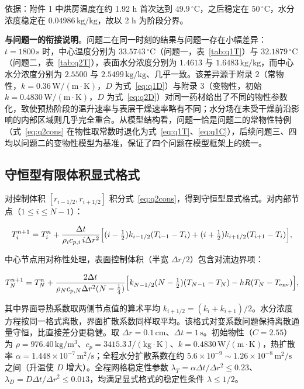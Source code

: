 \documentclass[withoutpreface,bwprint]{cumcmthesis} %
\begin{document}
依据：附件 1 中烘房温度在约 1.92 h 首次达到 $49.9\,{}^\circ$C，之后稳定在 $50\,{}^\circ$C，水分浓度稳定在 $0.04986\,\mathrm{kg/kg}$，故以 2 h 为阶段分界。

\textbf{与问题一的衔接说明}。问题二在同一时刻的结果与问题一存在小幅差异：$t=1800\,\mathrm{s}$ 时，中心温度分别为 $33.5743\,{}^\circ$C（问题一，表~\ref{tab:q1T}）与 $32.1879\,{}^\circ$C（问题二，表~\ref{tab:q2T}），表面水分浓度分别为 $1.4613$ 与 $1.6483\,\mathrm{kg/kg}$，而中心水分浓度分别为 $2.5500$ 与 $2.5499\,\mathrm{kg/kg}$、几乎一致。该差异源于附录 2（常物性，$k=0.36\,\mathrm{W/(m\cdot K)}$，$D$ 为式~\eqref{eq:q1D}）与附录 3（变物性，初始 $k=0.4830\,\mathrm{W/(m\cdot K)}$，$D$ 为式~\eqref{eq:q2D}）对同一药材给出了不同的物性参数化，致使预热阶段的温升速率与表层干燥速率略有不同；水分场在未受干燥前沿影响的内部区域则几乎完全重合。从模型结构看，问题一恰是问题二的常物性特例（式~\eqref{eq:q2cons} 在物性取常数时退化为式~\eqref{eq:q1T}、\eqref{eq:q1C}），后续问题三、四均以问题二的变物性模型为基准，保证了四个问题在模型框架上的统一。

\subsection{守恒型有限体积显式格式}

对控制体积 $[r_{i-1/2},r_{i+1/2}]$ 积分式~\eqref{eq:q2cons}，得到守恒型显式格式。对内部节点（$1\le i\le N-1$）：

\begin{equation}
T_i^{n+1}=T_i^n+\frac{\Delta t}{\rho_i c_{p,i}\,i\Delta r^2}
\Bigl[(i-\tfrac12)k_{i-1/2}(T_{i-1}-T_i)
+(i+\tfrac12)k_{i+1/2}(T_{i+1}-T_i)\Bigr],
\end{equation}

中心节点用对称性处理，表面控制体积（半宽 $\Delta r/2$）包含对流边界项：

\begin{equation}
T_N^{n+1}=T_N^n+\frac{2\Delta t}{\rho_N c_{p,N}\Delta r^2(N-\tfrac14)}
\Bigl[k_{N-1/2}(N-\tfrac12)(T_{N-1}-T_N)-hR(T_N-T_{\mathrm{env}})\Bigr],
\end{equation}

其中界面导热系数取两侧节点值的算术平均 $k_{i+1/2}=(k_i+k_{i+1})/2$。水分浓度方程按同一格式离散，界面扩散系数同样取平均。该格式对变系数问题保持离散通量守恒，比直接差分更稳健。取 $\Delta r=0.1\,\mathrm{cm}$、$\Delta t=1\,\mathrm{s}$。初始物性（$C=2.55$）为 $\rho=976.40\,\mathrm{kg/m^3}$、$c_p=3415.3\,\mathrm{J/(kg\cdot K)}$、$k=0.4830\,\mathrm{W/(m\cdot K)}$，热扩散率 $\alpha=1.448\times10^{-7}\,\mathrm{m^2/s}$；全程水分扩散系数在约 $5.6\times10^{-9}\sim1.26\times10^{-8}\,\mathrm{m^2/s}$ 之间（升温使 $D$ 增大）。全程网格稳定性参数 $\lambda_T=\alpha\Delta t/\Delta r^2\le0.23$、$\lambda_D=D\Delta t/\Delta r^2\le0.013$，均满足显式格式的稳定性条件 $\lambda\le1/2$。
\end{document}

